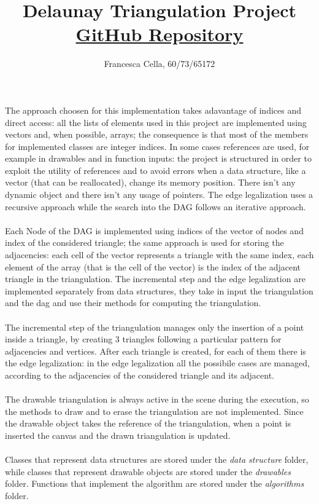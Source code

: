 \documentclass[12pt]{article}
\title{Delaunay Triangulation Project\\\href{https://github.com/UNICAAS2/as2-project-Frac7}{\small{GitHub Repository}}}
\author{Francesca Cella, 60/73/65172}
\date{}
\begin{document}
\maketitle

The approach choosen for this implementation takes adavantage of indices and direct access: all the lists of elements used in this project are implemented using vectors and, when possible, arrays; the consequence is that most of the members for implemented classes are integer indices. In some cases references are used, for example in drawables and in function inputs: the project is structured in order to exploit the utility of references and to avoid errors when a data structure, like a vector (that can be reallocated), change its memory position. There isn’t any dynamic object and there isn’t any usage of pointers. The edge legalization uses a recursive approach while the search into the DAG follows an iterative approach.\\\\
Each Node of the DAG is implemented using indices of the vector of nodes and index of the considered triangle; the same approach is used for storing the adjacencies: each cell of the vector represents a triangle with the same index, each element of the array (that is the cell of the vector) is the index of the adjacent triangle in the triangulation.
The incremental step and the edge legalization are implemented separately from data structures, they take in input the triangulation and the dag and use their methods for computing the triangulation.\\\\
The incremental step of the triangulation manages only the insertion of a point inside a triangle, by creating 3 triangles following a particular pattern for adjacencies and vertices. After each triangle is created, for each of them there is the edge legalization: in the edge legalization all the possibile cases are managed, according to the adjacencies of the considered triangle and its adjacent.\\\\
The drawable triangulation is always active in the scene during the execution, so the methods to draw and to erase the triangulation are not implemented. Since the drawable object takes the reference of the triangulation, when a point is inserted the canvas and the drawn triangulation is updated.\\\\
Classes that represent data structures are stored under the \textit{data structure} folder, while classes that represent drawable objects are stored under the \textit{drawables} folder. Functions that implement the algorithm are stored under the \textit{algorithms} folder.
\end{document}

